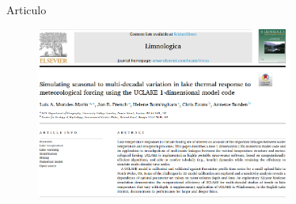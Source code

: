 \documentclass[
10pt,
aspectratio=169,
]{beamer}
\begin{document}
\begin{frame}{Articulo}
\vspace{-0.22cm}
\begin{figure}[!ht]
  \begin{center}
      \includegraphics[width=0.75\textwidth]{arti.png}
  \end{center}
\end{figure}
\end{frame}
\end{document}
